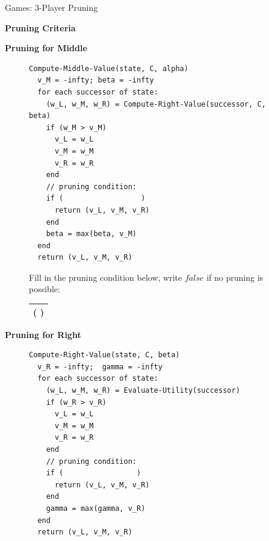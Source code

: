 \begin{problem}[18]{Games: 3-Player Pruning}
\begin{question}[6]{\bf Pruning Criteria}
\begin{subquestion}[2]{\bf Pruning for Middle}
\begin{figure}[H]
\begin{minipage}[b]{0.5\linewidth}
\vspace{0.2in}
\begin{verbatim}
Compute-Middle-Value(state, C, alpha)
  v_M = -infty; beta = -infty
  for each successor of state:
    (w_L, w_M, w_R) = Compute-Right-Value(successor, C, beta)
    if (w_M > v_M)
      v_L = w_L
      v_M = w_M
      v_R = w_R
    end
    // pruning condition:
    if (                  )
      return (v_L, v_M, v_R)
    end
    beta = max(beta, v_M)
  end
  return (v_L, v_M, v_R)
\end{verbatim}


\end{minipage}
\begin{minipage}[b]{0.5\linewidth}
\centering
Fill in the pruning condition below,
write $false$ if no pruning is possible:



\def\arraystretch{3}
\begin{tabular}{|c|}
\hline
\large{\textbf{(}} \solution{\hspace{3.1in}}{
  \OneDiiAnswer
}\large{\textbf{)}} \\
\hline
\end{tabular}


\end{minipage}
\end{figure}
\end{subquestion}

\newpage
\begin{subquestion}[2]{\bf Pruning for Right}

\begin{figure}[H]
\begin{minipage}[b]{0.5\linewidth}
\vspace{0.2in}
\begin{verbatim}
Compute-Right-Value(state, C, beta)
  v_R = -infty;  gamma = -infty
  for each successor of state:
    (w_L, w_M, w_R) = Evaluate-Utility(successor)
    if (w_R > v_R)
      v_L = w_L
      v_M = w_M
      v_R = w_R
    end
    // pruning condition:
    if (                 )
      return (v_L, v_M, v_R)
    end
    gamma = max(gamma, v_R)
  end
  return (v_L, v_M, v_R)
\end{verbatim}


\end{minipage}
\end{figure}
\end{subquestion}
\end{question}
\end{problem}

